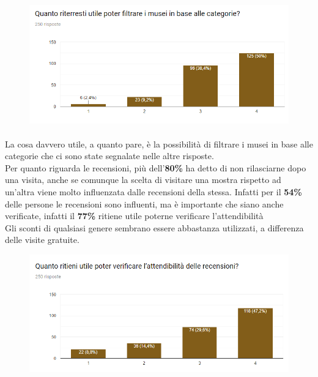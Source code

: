 \begin{figure}[ht]
    \centering
    \includegraphics[width=1.0\textwidth]{images/charts-questionario/chart-filtro-categorie.png}
\end{figure}

\paragraph{}
La cosa davvero utile, a quanto pare, è la possibilità di filtrare i musei in base alle categorie che ci sono state segnalate nelle altre risposte.\\
Per quanto riguarda le recensioni, più dell'\textbf{80\%} ha detto di non rilasciarne dopo una visita, anche se comunque la scelta di visitare una mostra rispetto ad un'altra viene molto influenzata dalle recensioni della stessa. Infatti per il \textbf{54\%} delle persone le recensioni sono influenti, ma è importante che siano anche verificate, infatti il \textbf{77\%} ritiene utile poterne verificare l'attendibilità\\
Gli sconti di qualsiasi genere sembrano essere abbastanza utilizzati, a differenza delle visite gratuite.

\begin{figure}[ht]
    \centering
    \includegraphics[width=1.0\textwidth]{images/charts-questionario/chart-verifica-recensioni.png}
\end{figure}

